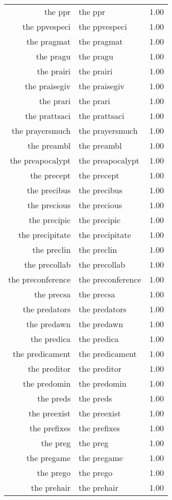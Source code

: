 \begin{table}[ht]
\begin{tabular}{rlr}
  the ppr & the ppr & 1.00 \\ 
  the ppvespeci & the ppvespeci & 1.00 \\ 
  the pragmat & the pragmat & 1.00 \\ 
  the pragu & the pragu & 1.00 \\ 
  the prairi & the prairi & 1.00 \\ 
  the praisegiv & the praisegiv & 1.00 \\ 
  the prari & the prari & 1.00 \\ 
  the prattsaci & the prattsaci & 1.00 \\ 
  the prayersmuch & the prayersmuch & 1.00 \\ 
  the preambl & the preambl & 1.00 \\ 
  the preapocalypt & the preapocalypt & 1.00 \\ 
  the precept & the precept & 1.00 \\ 
  the precibus & the precibus & 1.00 \\ 
  the precious & the precious & 1.00 \\ 
  the precipic & the precipic & 1.00 \\ 
  the precipitate & the precipitate & 1.00 \\ 
  the preclin & the preclin & 1.00 \\ 
  the precollab & the precollab & 1.00 \\ 
  the preconference & the preconference & 1.00 \\ 
  the precsa & the precsa & 1.00 \\ 
  the predators & the predators & 1.00 \\ 
  the predawn & the predawn & 1.00 \\ 
  the predica & the predica & 1.00 \\ 
  the predicament & the predicament & 1.00 \\ 
  the preditor & the preditor & 1.00 \\ 
  the predomin & the predomin & 1.00 \\ 
  the preds & the preds & 1.00 \\ 
  the preexist & the preexist & 1.00 \\ 
  the prefixes & the prefixes & 1.00 \\ 
  the preg & the preg & 1.00 \\ 
  the pregame & the pregame & 1.00 \\ 
  the prego & the prego & 1.00 \\ 
  the prehair & the prehair & 1.00 \\ 

\end{tabular}
\end{table}
